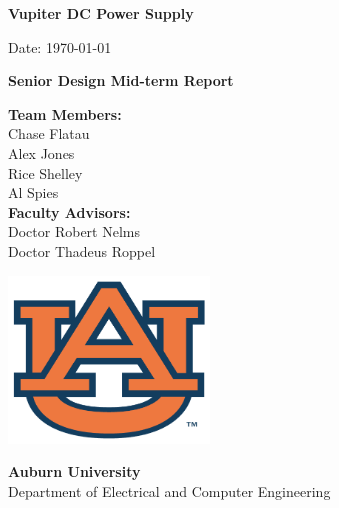 \documentclass[12pt]{article}
\begin{document}
\begin{titlepage}
    \begin{center}
        \vspace*{1cm}
            
        \Huge
        \textbf{Vupiter DC Power Supply}
            
        \vspace{0.5cm}
        \large
        Date: \today
            
        \vspace{2.25cm}

        \textbf{Senior Design Mid-term Report}
        
        \vspace{2.25cm}

        \textbf{Team Members:}\\
        Chase Flatau\\
        Alex Jones\\
        Rice Shelley\\
        Al Spies\\
        \textbf{Faculty Advisors:}\\
        Doctor Robert Nelms\\
        Doctor Thadeus Roppel
        \vfill
            
            
        \vspace{0.8cm}
            
        \includegraphics[width=0.4\textwidth]{university}
            
        \Large

        \textbf{Auburn University}\\
        Department of Electrical and Computer Engineering\\

            
    \end{center}
\end{titlepage}

\tableofcontents
\pagebreak
\end{document}
